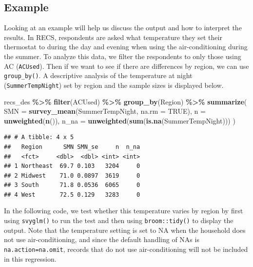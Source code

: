 \documentclass[
]{krantz}
\makeatletter
\newenvironment{Shaded}{\begin{snugshade}}{\end{snugshade}}
\newcommand{\AttributeTok}[1]{\textcolor[rgb]{0.27,0.27,0.27}{#1}}
\newcommand{\ConstantTok}[1]{\textcolor[rgb]{0.37,0.37,0.37}{#1}}
\newcommand{\FunctionTok}[1]{\textcolor[rgb]{0.27,0.27,0.27}{\textbf{#1}}}
\newcommand{\NormalTok}[1]{#1}
\newcommand{\SpecialCharTok}[1]{\textcolor[rgb]{0.43,0.43,0.43}{\textbf{#1}}}
\newenvironment{kframe}{%
\medskip{}
\setlength{\fboxsep}{.8em}
 \def\at@end@of@kframe{}%
 \ifinner\ifhmode%
  \def\at@end@of@kframe{\end{minipage}}%
  \begin{minipage}{\columnwidth}%
 \fi\fi%
 \def\FrameCommand##1{\hskip\@totalleftmargin \hskip-\fboxsep
 \colorbox{shadecolor}{##1}\hskip-\fboxsep
     \hskip-\linewidth \hskip-\@totalleftmargin \hskip\columnwidth}%
 \MakeFramed {\advance\hsize-\width
   \@totalleftmargin\z@ \linewidth\hsize
   \@setminipage}}%
 {\par\unskip\endMakeFramed%
 \at@end@of@kframe}
\renewenvironment{Shaded}{\begin{kframe}}{\end{kframe}}
\makeatother
\begin{document}
\hypertarget{example-1}{%
\subsection{Example}\label{example-1}}

Looking at an example will help us discuss the output and how to interpret the results. In RECS, respondents are asked what temperature they set their thermostat to during the day and evening when using the air-conditioning during the summer. To analyze this data, we filter the respondents to only those using AC (\texttt{ACUsed}). Then if we want to see if there are differences by region, we can use \texttt{group\_by()}. A descriptive analysis of the temperature at night (\texttt{SummerTempNight}) set by region and the sample sizes is displayed below.

\begin{Shaded}
\begin{Highlighting}[]
\NormalTok{recs\_des }\SpecialCharTok{\%\textgreater{}\%}
  \FunctionTok{filter}\NormalTok{(ACUsed) }\SpecialCharTok{\%\textgreater{}\%}
  \FunctionTok{group\_by}\NormalTok{(Region) }\SpecialCharTok{\%\textgreater{}\%}
  \FunctionTok{summarize}\NormalTok{(}
    \AttributeTok{SMN =} \FunctionTok{survey\_mean}\NormalTok{(SummerTempNight, }\AttributeTok{na.rm =} \ConstantTok{TRUE}\NormalTok{),}
    \AttributeTok{n =} \FunctionTok{unweighted}\NormalTok{(}\FunctionTok{n}\NormalTok{()),}
    \AttributeTok{n\_na =} \FunctionTok{unweighted}\NormalTok{(}\FunctionTok{sum}\NormalTok{(}\FunctionTok{is.na}\NormalTok{(SummerTempNight)))}
\NormalTok{  )}
\end{Highlighting}
\end{Shaded}

\begin{verbatim}
## # A tibble: 4 x 5
##   Region      SMN SMN_se     n  n_na
##   <fct>     <dbl>  <dbl> <int> <int>
## 1 Northeast  69.7 0.103   3204     0
## 2 Midwest    71.0 0.0897  3619     0
## 3 South      71.8 0.0536  6065     0
## 4 West       72.5 0.129   3283     0
\end{verbatim}

In the following code, we test whether this temperature varies by region by first using \texttt{svyglm()} to run the test and then using \texttt{broom::tidy()} to display the output. Note that the temperature setting is set to NA when the household does not use air-conditioning, and since the default handling of NAs is \texttt{na.action=na.omit}, records that do not use air-conditioning will not be included in this regression.
\end{document}
